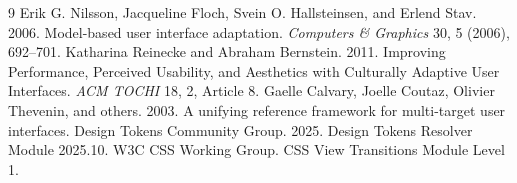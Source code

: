 \documentclass[manuscript,anonymous]{acmart}
\begin{document}
\begingroup\scriptsize
\begin{thebibliography}{9}
\setlength{\itemsep}{0pt}\setlength{\parsep}{0pt}\setlength{\parskip}{0pt}
Erik G. Nilsson, Jacqueline Floch, Svein O. Hallsteinsen, and Erlend Stav.
2006. Model-based user interface adaptation. \emph{Computers \& Graphics} 30, 5 (2006), 692--701.
Katharina Reinecke and Abraham Bernstein. 2011. Improving Performance, Perceived Usability,
and Aesthetics with Culturally Adaptive User Interfaces. \emph{ACM TOCHI} 18, 2, Article 8.
Gaelle Calvary, Joelle Coutaz, Olivier Thevenin, and others. 2003.
A unifying reference framework for multi-target user interfaces.
Design Tokens Community Group. 2025. Design Tokens Resolver Module 2025.10.
W3C CSS Working Group. CSS View Transitions Module Level 1.
\end{thebibliography}
\endgroup
\end{document}
